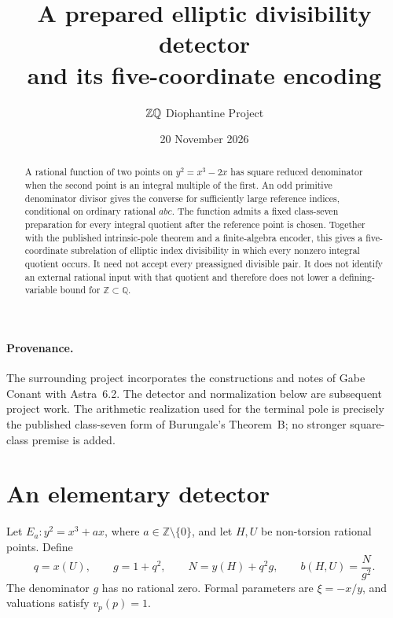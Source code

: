 \documentclass[11pt]{article}
\title{A prepared elliptic divisibility detector\\and its five-coordinate encoding}
\author{\(\Z\Q\) Diophantine Project}
\date{20 November 2026}
\newcommand{\Q}{\mathbb Q}
\newcommand{\Z}{\mathbb Z}
\begin{document}
\maketitle
\begin{abstract}
A rational function of two points on \(y^2=x^3-2x\) has square reduced
denominator when the second point is an integral multiple of the first.
An odd primitive denominator divisor gives the converse for sufficiently
large reference indices, conditional on ordinary rational \(abc\).
The function admits a fixed class-seven preparation for every integral
quotient after the reference point is chosen. Together with the published
intrinsic-pole theorem and a finite-algebra encoder, this gives a
five-coordinate subrelation of elliptic index divisibility in which every
nonzero integral quotient occurs. It need not accept every preassigned
divisible pair. It does not identify an external rational input with that
quotient and therefore does not lower a defining-variable bound for
\(\Z\subset\Q\).
\end{abstract}

\paragraph{Provenance.}
The surrounding project incorporates the constructions and notes of Gabe
Conant with Astra~6.2. The detector and normalization below are subsequent
project work. The arithmetic realization used for the terminal pole is
precisely the published class-seven form of Burungale's Theorem~B; no
stronger square-class premise is added.

\section{An elementary detector}

Let \(E_a:y^2=x^3+ax\), where \(a\in\Z\setminus\{0\}\), and let \(H,U\)
be non-torsion rational points. Define
\begin{equation}\label{eq:b}
 q=x(U),\qquad g=1+q^2,\qquad
 N=y(H)+q^2g,\qquad b(H,U)=\frac{N}{g^2}.
\end{equation}
The denominator \(g\) has no rational zero. Formal parameters are
\(\xi=-x/y\), and valuations satisfy \(v_p(p)=1\).
\end{document}
